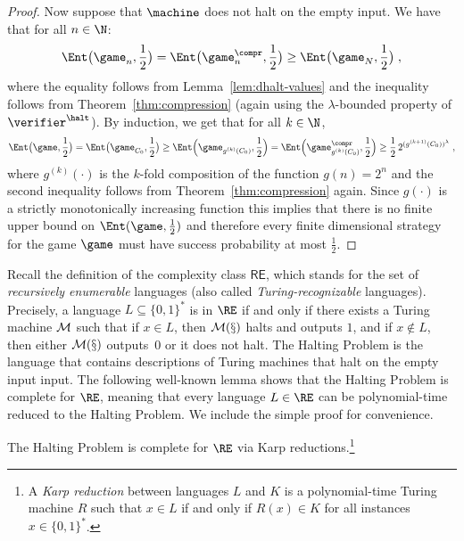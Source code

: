 \begin{proof}
	Now suppose that $\machine$ does not halt on the empty input.
  We have that for all $n \in \N$:
  \begin{equation*}
		\Ent\big(\game_n,\frac{1}{2}\big) = \Ent\big(\game^\compr_n,\frac{1}{2}\big) \geq
    \Ent\big(\game_{N},\frac{1}{2}\big)\;,
  \end{equation*}
	where the equality follows from Lemma~\ref{lem:dhalt-values} and the
  inequality follows from Theorem~\ref{thm:compression} (again using the
  $\lambda$-bounded property of $\verifier^\halt$).
  By induction, we get that for all $k \in \N$,
  \begin{equation*}
		\Ent\big(\game,\frac{1}{2}\big) = \Ent\big(\game_{C_0}, \frac{1}{2}\big) \geq
    \Ent \Bigl( \game_{g^{(k)}(C_0)}, \frac{1}{2} \Bigr) =
    \Ent \Bigl( \game^\compr_{g^{(k)}(C_0)}, \frac{1}{2} \Bigr) \geq
    \frac{1}{2} \, 2^{(g^{(k+1)}(C_0))^\lambda }\;,
  \end{equation*}
	where $g^{(k)}(\cdot)$ is the $k$-fold composition of the function $g(n) =
  2^{n}$ and the second inequality follows from Theorem~\ref{thm:compression}
  again.
  Since $g(\cdot)$ is a strictly monotonically increasing function this implies that there is no finite upper bound on
  $\Ent(\game,\frac{1}{2})$ and therefore every finite dimensional strategy for the
  game $\game$ must have success probability at most $\frac{1}{2}$.
\end{proof}

Recall the definition of the complexity class $\mathsf{RE}$, which stands for
the set of \emph{recursively enumerable} languages (also called
\emph{Turing-recognizable} languages).
Precisely, a language $L \subseteq \{0,1\}^*$ is in $\RE$ if and only if there
exists a Turing machine $\cal{M}$ such that if $x \in L$, then $\cal{M}(x)$
halts and outputs $1$, and if $x \notin L$, then either $\cal{M}(x)$ outputs~$0$
or it does not halt.
The Halting Problem is the language that contains descriptions of Turing
machines that halt on the empty input input.
The following well-known lemma shows that the Halting Problem is complete for
$\RE$, meaning that every language $L \in \RE$ can be polynomial-time reduced
to the Halting Problem. We include the simple proof for convenience. 

\begin{lemma}
  The Halting Problem is complete for $\RE$ via Karp reductions.\footnote{A \emph{Karp reduction} between languages $L$ and $K$ is a polynomial-time Turing machine $R$ such that $x \in L$ if and only if $R(x) \in K$ for all instances $x \in \{0,1\}^*$.}
\end{lemma}

